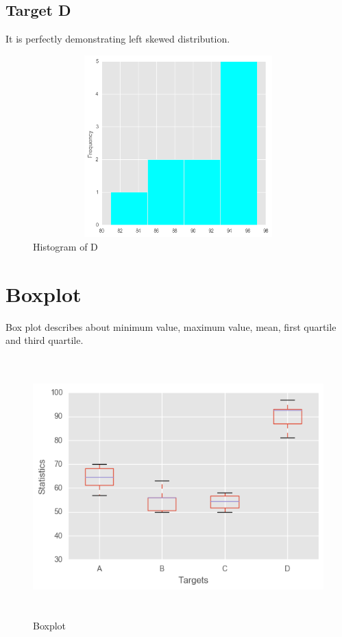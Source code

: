 \documentclass[11pt]{report}
\begin{document}
\subsection{Target D}
It is perfectly demonstrating left skewed distribution.
\begin{center}
\begin{figure}[h!]
  \centering
  \includegraphics[height = 7cm, width = 14cm]{D_hist.png}
  \caption{Histogram of D}
  \label{fig:hist_d}
\end{figure} 
\end{center}

\section{Boxplot}
Box plot describes about minimum value, maximum value, mean, first quartile and third quartile.

\begin{figure}[!h]
  \centering
  \includegraphics[height = 10cm, width = 14cm]{boxplot.png}
  \caption{Boxplot}
  \label{fig:boxplot}
\end{figure}
\end{document}
